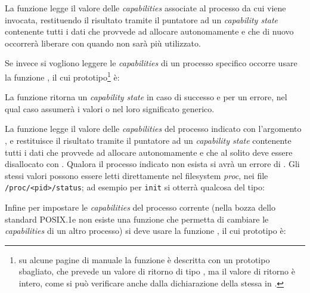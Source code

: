 La funzione legge il valore delle \textit{capabilities} associate al processo
da cui viene invocata, restituendo il risultato tramite il puntatore ad un
\textit{capability state} contenente tutti i dati che provvede ad allocare
autonomamente e che di nuovo occorrerà liberare con  quando
non sarà più utilizzato.

Se invece si vogliono leggere le \textit{capabilities} di un processo
specifico occorre usare la funzione , il cui
prototipo\footnote{su alcune pagine di manuale la funzione è descritta con un
  prototipo sbagliato, che prevede un valore di ritorno di tipo ,
  ma il valore di ritorno è intero, come si può verificare anche dalla
  dichiarazione della stessa in .} è:

\begin{funcproto}{
}

{La funzione ritorna un \textit{capability state} in caso di successo e
   per un errore, nel qual caso  assumerà i valori
   o  nel loro significato generico.  }
\end{funcproto}

La funzione legge il valore delle \textit{capabilities} del processo indicato
con l'argomento , e restituisce il risultato tramite il puntatore
ad un \textit{capability state} contenente tutti i dati che provvede ad
allocare autonomamente e che al solito deve essere disallocato con
. Qualora il processo indicato non esista si avrà un errore di
. Gli stessi valori possono essere letti direttamente nel
filesystem \textit{proc}, nei file \texttt{/proc/<pid>/status}; ad esempio per
\texttt{init} si otterrà qualcosa del tipo:


Infine per impostare le \textit{capabilities} del processo corrente (nella
bozza dello standard POSIX.1e non esiste una funzione che permetta di cambiare
le \textit{capabilities} di un altro processo) si deve usare la funzione
, il cui prototipo è:

